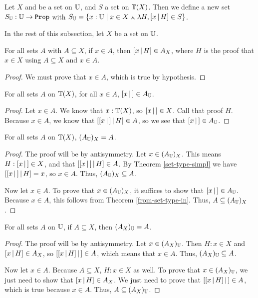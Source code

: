 \documentclass[../math.tex]{subfiles}
\begin{document}
\begin{definition}
    Let $X$ and be a set on $\mathbb{U}$, and $S$ a set on $\mathbb{T}(X)$.  Then we define a
    new set $S_\U : \U \rightarrow \Prop$ with $S_{\mathbb{U}} = \{x : \mathbb{U} \mid x \in X
    \curlywedge \lambda H, [ x \, | \, H ] \in S\}$.
\end{definition}

In the rest of this subsection, let $X$ be a set on $\mathbb{U}$.

\begin{theorem} \label{to-set-type-in}
    For all sets $A$ with $A \subseteq X$, if $x \in A$, then $[ x \, | \, H ] \in
    A_X$, where $H$ is the proof that $x \in X$ using $A \subseteq X$ and $x \in
    A$.
\end{theorem}
\begin{proof}
    We must prove that $x \in A$, which is true by hypothesis.
\end{proof}

\begin{theorem} \label{from-set-type-in}
    For all sets $A$ on $\mathbb{T}(X)$, for all $x \in A$, $[ x\, |\,] \in A_{\mathbb{U}}$.
\end{theorem}
\begin{proof}
    Let $x \in A$.  We know that $x : \mathbb{T}(X)$, so $[ x\, |\,] \in X$.  Call that
    proof $H$.  Because $x \in A$, we know that $[ [ x\, |\,] \, | \, H ] \in A$, so we
    see that $[ x\, |\,] \in A_{\mathbb{U}}$.
\end{proof}

\begin{theorem} \label{to-from-set-type}
    For all sets $A$ on $\mathbb{T}(X)$, $(A_{\mathbb{U}})_X = A$.
\end{theorem}
\begin{proof}
    The proof will be by antisymmetry.  Let $x \in (A_{\mathbb{U}})_X$.  This means $H :
    [ x\, |\,] \in X$, and that $[ [ x\, |\,] \, | \, H ] \in A$.  By Theorem
    \ref{set-type-simpl} we have $[ [ x\, |\,] \, | \, H ] = x$, so $x \in A$.  Thus,
    $(A_{\mathbb{U}})_X \subseteq A$.

    Now let $x \in A$.  To prove that $x \in (A_{\mathbb{U}})_X$, it suffices to show that
    $[ x\, |\,] \in A_{\mathbb{U}}$.  Because $x \in A$, this follows from Theorem
    \ref{from-set-type-in}.  Thus, $A \subseteq (A_{\mathbb{U}})_X$.
\end{proof}

\begin{theorem} \label{from-to-set-type}
    For all sets $A$ on $\mathbb{U}$, if $A \subseteq X$, then $(A_X)_{\mathbb{U}} = A$.
\end{theorem}
\begin{proof}
    The proof will be by antisymmetry.  Let $x \in (A_X)_{\mathbb{U}}$.  Then $H : x \in
    X$ and $[ x \, | \, H ] \in A_X$, so $[ [ x \, | \, H ]\, |\,] \in A$, which means that $x
    \in A$.  Thus, $(A_X)_{\mathbb{U}} \subseteq A$.

    Now let $x \in A$.  Because $A \subseteq X$, $H : x \in X$ as well.  To
    prove that $x \in (A_X)_{\mathbb{U}}$, we just need to show that $[ x \, | \, H ] \in A_X$.
    We just need to prove that $[ [ x \, | \, H ]\, |\,] \in A$, which is true because $x
    \in A$.  Thus, $A \subseteq (A_X)_{\mathbb{U}}$.
\end{proof}
\end{document}
